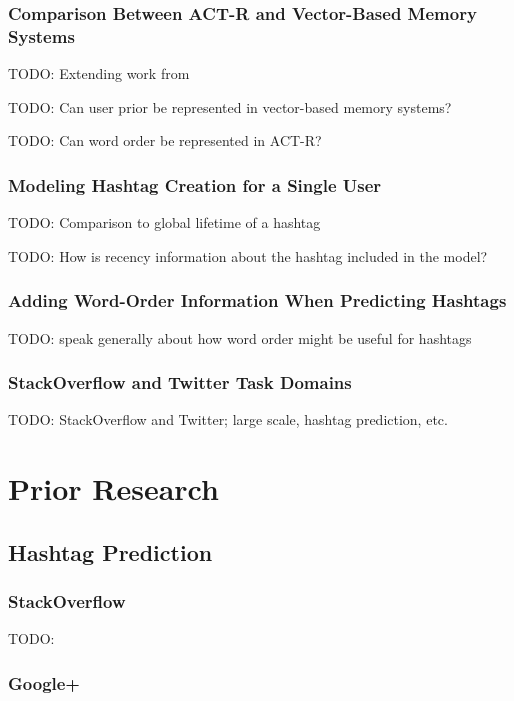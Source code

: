 \documentclass[man]{apa6}
\begin{document}
\subsubsection{Comparison Between ACT-R and Vector-Based Memory Systems}

TODO: Extending work from \cite{Rutledge2008}

TODO: Can user prior be represented in vector-based memory systems?

TODO: Can word order be represented in ACT-R?

\subsubsection{Modeling Hashtag Creation for a Single User}

TODO: Comparison to global lifetime of a hashtag \cite{Tsur2012}

TODO: How is recency information about the hashtag included in the model?

\subsubsection{Adding Word-Order Information When Predicting Hashtags}

TODO: speak generally about how word order might be useful for hashtags

\subsubsection{StackOverflow and Twitter Task Domains}

TODO: StackOverflow and Twitter; large scale, hashtag prediction, etc. 

\section{Prior Research}

\subsection{Hashtag Prediction}

\subsubsection{StackOverflow}

TODO: \cite{Kuo2011}

\subsubsection{Google+}
\end{document}
